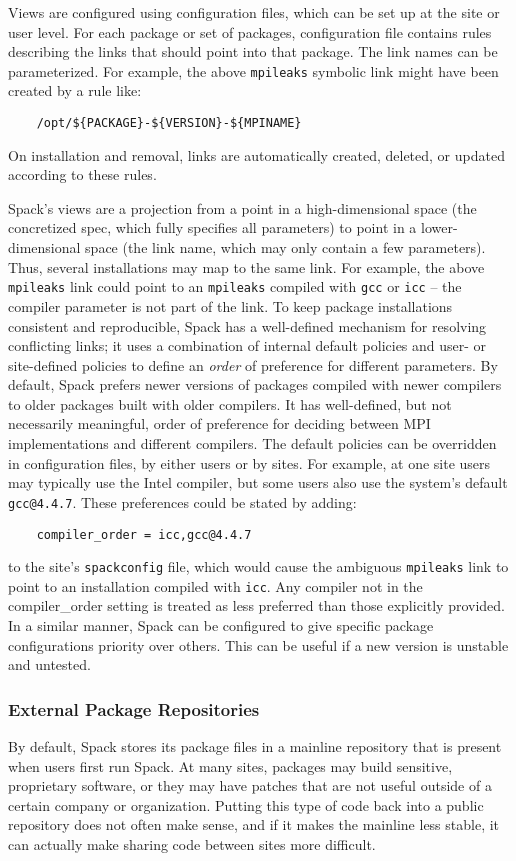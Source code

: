 Views are configured using configuration files, which can be set up at the site or
user level.
For each package or set of packages, configuration file contains rules
describing the links that should point into that package.
The link names can be parameterized.
For example, the above {\tt mpileaks} symbolic link might have been created by a rule like:
%
\begin{verbatim}
    /opt/${PACKAGE}-${VERSION}-${MPINAME}
\end{verbatim}
%
On installation and removal,
links are automatically created, deleted, or updated according to these rules.  

Spack's views are a projection from a point in a high-dimensional space
(the concretized spec, which fully specifies all parameters) to point
in a lower-dimensional space
(the link name, which may only contain a few parameters).
Thus, several installations may map to the same link.
For example, the above {\tt mpileaks} link could point to an {\tt mpileaks} compiled with
{\tt gcc} or {\tt icc} -- the compiler parameter is not part of the link.
To keep  package installations consistent and reproducible,
Spack has a well-defined mechanism for resolving conflicting links;
it uses a combination of internal default policies and user- or site-defined
policies to define an {\it order} of preference for different parameters.
By default, Spack prefers newer versions of packages compiled with newer compilers
to older packages built with older compilers. It has well-defined, but not 
necessarily meaningful, order of preference for deciding between MPI
implementations and different compilers.
The default policies can be overridden in configuration files, by either users
or by sites. For example, at one site users may typically use the Intel compiler,
but some users also use the system's default {\tt gcc@4.4.7}.
These preferences could be stated by adding:
%
\begin{verbatim}
    compiler_order = icc,gcc@4.4.7
\end{verbatim}
%
to the site's {\tt spackconfig} file, which would cause the ambiguous
{\tt mpileaks} link to point to an installation compiled with {\tt icc}.
Any compiler not in the compiler\_order setting is treated as less preferred
than those explicitly provided.
%
In a similar manner, Spack can be configured to give specific package
configurations priority over others.
This can be useful if a new version is unstable and untested.

\subsubsection{External Package Repositories}
By default, Spack stores its package files in a mainline repository
that is present when users
first run Spack.  At many sites, packages may build sensitive,
proprietary software, or they 
may have patches that are not useful outside of a certain company or
organization.  Putting this type of code back into a public repository
does not often make sense, and if it makes the
mainline less stable, it can actually make sharing code between sites more difficult.  

